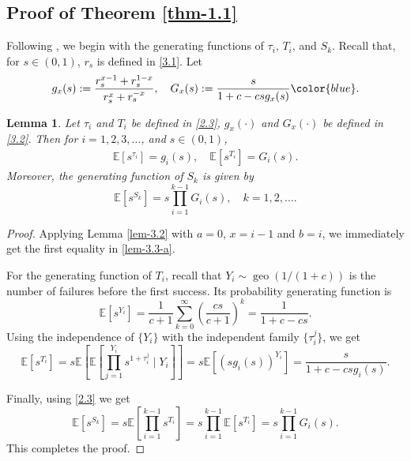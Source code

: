 \documentclass[12pt]{article}
\newtheorem{lem}[thm]{Lemma}
\numberwithin{equation}{section}
\begin{document}
\subsection{Proof of Theorem \ref{thm-1.1}}


Following \cite[Lemma 3.2]{PS},  we begin with the generating functions of $\tau_{i}$, $T_{i}$, and $S_{k}$.
Recall that,  for $s\in(0,1)$, $r_s$ is defined in \eqref{3.1}.
 Let
\begin{equation}\label{3.2}
g_{x}(s):=\frac{r_s^{x-1}+r_s^{1-x}}{r_s^{x}+r_s^{-x}}, \quad G_{x}(s):=\frac{s}{1+c-cs g_{x}(s)}{\color{blue} .}
\end{equation}


\begin{lem}\label{lem-3.3}
Let $\tau_{i}$ and $T_{i}$  be defined in \eqref{2.3}, $g_x(\cdot)$ and $G_x(\cdot)$ be defined in \eqref{3.2}. Then
for $i=1,2,3,\ldots$, and $s\in (0,1)$,
\begin{align}\label{lem-3.3-a}
\mathbb{E}\left[s^{\tau_{i}}\right]=g_{i}(s), \quad \mathbb{E}\left[s^{T_{i}}\right]=G_{i}(s).
\end{align}
Moreover, the generating function of $S_{k}$ is given by
\begin{equation}
\mathbb{E}\left[s^{S_{k}}\right]=s \prod_{i=1}^{k-1} G_{i}(s), \quad k=1,2,
\ldots.
\end{equation}
\end{lem}

\begin {proof}
Applying Lemma \ref{lem-3.2} with $a=0$,
 $x=i-1$
and $b=i$, we immediately get the first equality in
\eqref{lem-3.3-a}.

For the generating function of $T_{i}$, recall that  $Y_{i} \sim \operatorname{geo}(1 /(1+c))$ is
 the number of failures before the first success.  Its probability  generating function is
\begin{equation*}
\mathbb E\left[s^{Y_i}\right]= \frac{1}{c+1} \sum_{k=0}^{\infty}\left(\frac{c s}{c+1}\right)^{k}=\frac{1}{1+c-c s}.
\end{equation*}
Using the independence of $\{Y_i\}$ with the independent family $\{\tau^j_i\}$, we get
\begin{equation*}
\mathbb{E}\left[s^{T_{i}}\right]=s \mathbb{E}\left[\mathbb{E}\left[\prod_{j=1}^{Y_{i}} s^{1+\tau_{i}^{j}} \mid Y_{i}\right]\right]=s\mathbb{E}\left[\left(s g_{i}(s)\right)^{Y_{i}}\right]=\frac{s}{1+c-csg_{i}(s)} .
\end{equation*}

Finally, using  \eqref{2.3} we get
\begin{equation*}
\mathbb{E}\left [s^{S_{k}}\right ]=s\mathbb{E}\left[\prod_{i=1}^{k-1}s^{T_i}\right]=s\prod_{i=1}^{k-1}\mathbb{E}\left[s^{T_i}\right] =s\prod_{i=1}^{k-1}G_i(s).
\end{equation*}
This completes the proof.
\end{proof}
\end{document}
